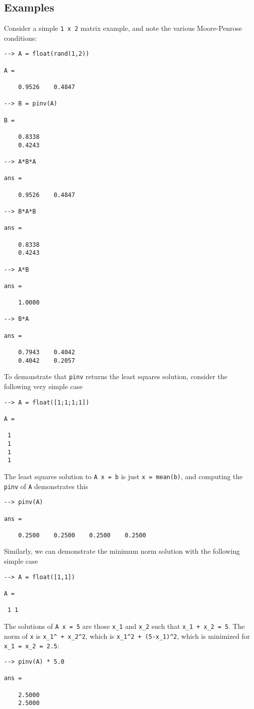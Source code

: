 \subsection{Examples}

Consider a simple \verb|1 x 2| matrix example, and note the various
Moore-Penrose conditions:
\begin{verbatim}
--> A = float(rand(1,2))

A = 

    0.9526    0.4847 

--> B = pinv(A)

B = 

    0.8338 
    0.4243 

--> A*B*A

ans = 

    0.9526    0.4847 

--> B*A*B

ans = 

    0.8338 
    0.4243 

--> A*B

ans = 

    1.0000 

--> B*A

ans = 

    0.7943    0.4042 
    0.4042    0.2057 
\end{verbatim}
To demonstrate that \verb|pinv| returns the least squares solution,
consider the following very simple case
\begin{verbatim}
--> A = float([1;1;1;1])

A = 

 1 
 1 
 1 
 1 
\end{verbatim}
The least squares solution to \verb|A x = b| is just \verb|x = mean(b)|,
and computing the \verb|pinv| of \verb|A| demonstrates this
\begin{verbatim}
--> pinv(A)

ans = 

    0.2500    0.2500    0.2500    0.2500 
\end{verbatim}
Similarly, we can demonstrate the minimum norm solution with
the following simple case
\begin{verbatim}
--> A = float([1,1])

A = 

 1 1 
\end{verbatim}
The solutions of \verb|A x = 5| are those \verb|x_1| and \verb|x_2| such that
\verb|x_1 + x_2 = 5|.  The norm of \verb|x| is \verb|x_1^ + x_2^2|, which is
\verb|x_1^2 + (5-x_1)^2|, which is minimized for \verb|x_1 = x_2 = 2.5|:
\begin{verbatim}
--> pinv(A) * 5.0

ans = 

    2.5000 
    2.5000 
\end{verbatim}
